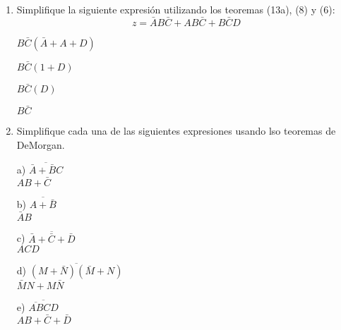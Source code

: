 \documentclass[a4paper, 12pt]{article}
\newcommand{\Aspace}{0.2cm}
\begin{document}
\begin{enumerate}
        
        \item Simplifique la siguiente expresión utilizando los teoremas (13a), (8) y (6):
        \[ z = \bar{A}B\bar{C} + AB\bar{C} + B\bar{C}D \]
            \par
            { \color{azul} 
                        $B\bar{C}(\bar{A} + A + D)$
                \par    $B\bar{C}(1 + D)$
                \par    $B\bar{C}(D)$
                \par    $B\bar{C}$
            }



        \item Simplifique cada una de las siguientes expresiones usando lso teoremas de DeMorgan.
            \vspace{\Aspace} \par
            a) $\overline{\bar{A} + \bar{B}C}$
            \\ { \color{azul} $AB + \bar{C}$ }

            \vspace{\Aspace} \par
            b) $\overline{A + \bar{B}}$
            \\ { \color{azul} $\bar{A}B$ }

            \vspace{\Aspace} \par
            c) $\overline{\bar{A} + \bar{C} + \bar{D}}$
            \\ { \color{azul} $ACD$ }

            \vspace{\Aspace} \par
            d) $\overline{(M + \bar{N})(\bar{M} + N)}$
            \\ { \color{azul} $\bar{M}N + M\bar{N}$ }

            \vspace{\Aspace} \par
            e) $\overline{\overline{AB}CD}$
            \\ { \color{azul} $AB + \bar{C} + \bar{D}$ }




\end{enumerate}
\end{document}
